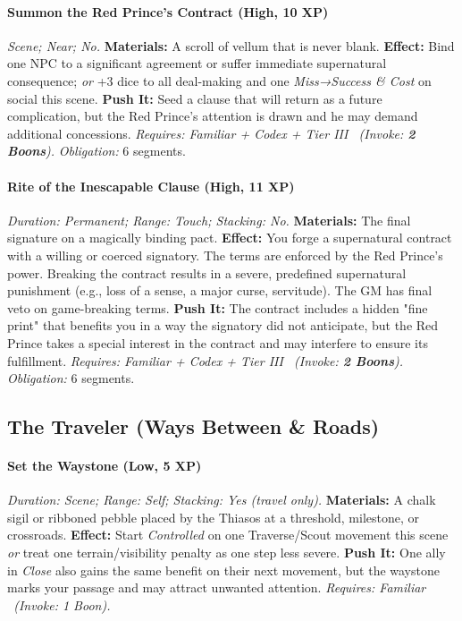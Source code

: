 \documentclass[12pt,twoside]{book}
\begin{document}
\paragraph{Summon the Red Prince's Contract (High, 10 XP)} \emph{Scene; Near; No.}
\textbf{Materials:} A scroll of vellum that is never blank.
\textbf{Effect:} Bind one NPC to a significant agreement or suffer immediate supernatural consequence; \emph{or} +3 dice to all deal-making and one \emph{Miss→Success \& Cost} on social this scene.
\textbf{Push It:} Seed a clause that will return as a future complication, but the Red Prince's attention is drawn and he may demand additional concessions.
\emph{Requires: Familiar + Codex + Tier III \ (\textit{Invoke:} \textbf{2 Boons}).}
\emph{Obligation:} 6 segments.

\paragraph{Rite of the Inescapable Clause (High, 11 XP)} \emph{Duration: Permanent; Range: Touch; Stacking: No.}
\textbf{Materials:} The final signature on a magically binding pact.
\textbf{Effect:} You forge a supernatural contract with a willing or coerced signatory. The terms are enforced by the Red Prince's power. Breaking the contract results in a severe, predefined supernatural punishment (e.g., loss of a sense, a major curse, servitude). The GM has final veto on game-breaking terms.
\textbf{Push It:} The contract includes a hidden "fine print" that benefits you in a way the signatory did not anticipate, but the Red Prince takes a special interest in the contract and may interfere to ensure its fulfillment.
\emph{Requires: Familiar + Codex + Tier III \ (\textit{Invoke:} \textbf{2 Boons}).}
\emph{Obligation:} 6 segments.

\subsection{The Traveler (Ways Between \& Roads)}
\paragraph{Set the Waystone (Low, 5 XP)} \emph{Duration: Scene; Range: Self; Stacking: Yes (travel only).}
\textbf{Materials:} A chalk sigil or ribboned pebble placed by the Thiasos at a threshold, milestone, or crossroads.
\textbf{Effect:} Start \emph{Controlled} on one Traverse/Scout movement this scene \emph{or} treat one terrain/visibility penalty as one step less severe.
\textbf{Push It:} One ally in \emph{Close} also gains the same benefit on their next movement, but the waystone marks your passage and may attract unwanted attention.
\emph{Requires: Familiar \ (\textit{Invoke:} 1 Boon).}
\end{document}
